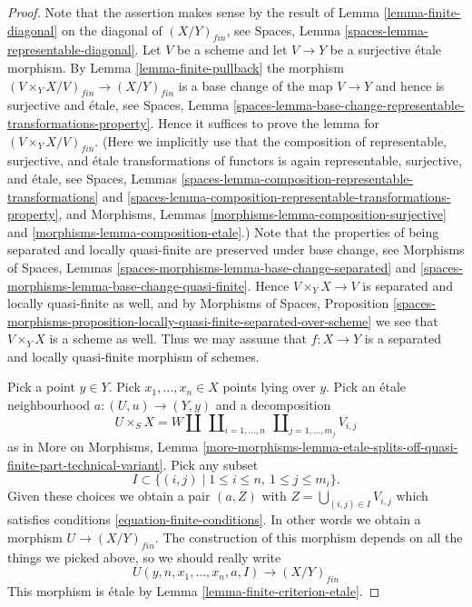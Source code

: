 \documentclass{stacks-project}
\theoremstyle{plain}
\theoremstyle{definition}
\theoremstyle{remark}
\numberwithin{equation}{subsection}
\begin{document}
\begin{proof}
Note that the assertion makes sense by the result of
Lemma \ref{lemma-finite-diagonal}
on the diagonal of $(X/Y)_{fin}$, see
Spaces, Lemma \ref{spaces-lemma-representable-diagonal}.
Let $V$ be a scheme and let $V \to Y$ be a surjective \'etale morphism. By
Lemma \ref{lemma-finite-pullback}
the morphism $(V \times_Y X/V)_{fin} \to (X/Y)_{fin}$ is
a base change of the map $V \to Y$ and hence is surjective and \'etale, see
Spaces,
Lemma \ref{spaces-lemma-base-change-representable-transformations-property}.
Hence it suffices to prove the lemma for $(V \times_Y X/V)_{fin}$.
(Here we implicitly use that the composition of representable, surjective, and
\'etale transformations of functors is again representable, surjective, and
\'etale, see
Spaces, Lemmas \ref{spaces-lemma-composition-representable-transformations} and
\ref{spaces-lemma-composition-representable-transformations-property}, and
Morphisms, Lemmas \ref{morphisms-lemma-composition-surjective} and
\ref{morphisms-lemma-composition-etale}.)
Note that the properties of being separated and locally quasi-finite
are preserved under base change, see
Morphisms of Spaces,
Lemmas \ref{spaces-morphisms-lemma-base-change-separated} and
\ref{spaces-morphisms-lemma-base-change-quasi-finite}.
Hence $V \times_Y X \to V$ is separated and locally quasi-finite as well,
and by
Morphisms of Spaces, Proposition
\ref{spaces-morphisms-proposition-locally-quasi-finite-separated-over-scheme}
we see that $V \times_Y X$ is a scheme as well.
Thus we may assume that $f : X \to Y$ is a separated and locally quasi-finite
morphism of schemes.

\medskip\noindent
Pick a point $y \in Y$. Pick $x_1, \ldots, x_n \in X$ points
lying over $y$. Pick an \'etale neighbourhood $a : (U, u) \to (Y, y)$ and a
decomposition
$$
U \times_S X =
W \amalg
\ \coprod\nolimits_{i = 1, \ldots, n}
\ \coprod\nolimits_{j = 1, \ldots, m_j}
V_{i, j}
$$
as in
More on Morphisms, Lemma
\ref{more-morphisms-lemma-etale-splits-off-quasi-finite-part-technical-variant}.
Pick any subset
$$
I \subset \{(i, j) \mid 1 \leq i \leq n, \ 1 \leq j \leq m_i\}.
$$
Given these choices we obtain a pair $(a, Z)$ with
$Z = \bigcup_{(i, j) \in I} V_{i, j}$
which satisfies conditions \ref{equation-finite-conditions}. In other words
we obtain a morphism $U \to (X/Y)_{fin}$. The construction of this morphism
depends on all the things we picked above, so we should really write
$$
U(y, n, x_1, \ldots, x_n, a, I) \longrightarrow (X/Y)_{fin}
$$
This morphism is \'etale by Lemma \ref{lemma-finite-criterion-etale}.


\end{proof}
\end{document}
